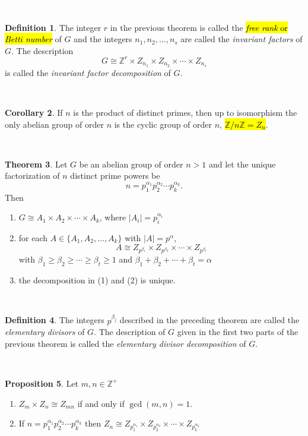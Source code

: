 \documentclass{article}
\theoremstyle{definition}
\newtheorem{thm}{Theorem}[section]
\newtheorem{prop}[thm]{Proposition}
\newtheorem{cor}[thm]{Corollary}
\newtheorem{defn}[thm]{Definition}
\newcommand{\nl}{\textcolor{white}{nothing}}
\newcommand{\Z}{\mathbb{Z}}
\newcommand{\al}{\alpha}
\newcommand{\be}{\beta}
\begin{document}
\nl

\begin{defn}
The integer $r$ in the previous theorem is called the \hl{\textit{free rank} or \textit{Betti number}} of $G$ and the integers $n_1, n_2,\ldots,n_s$ are called the \textit{invariant factors} of $G$. The description 
\[G\cong \Z^r\times Z_{n_1}\times Z_{n_2}\times\cdots\times Z_{n_s}\]
is called the \textit{invariant factor decomposition} of $G$.
\end{defn}

\nl

\begin{cor}
If $n$ is the product of distinct primes, then up to isomorphism the only abelian group of order $n$ is the cyclic group of order $n$, \hl{$\Z/n\Z = Z_n$}.
\end{cor}

\nl

\begin{thm}
Let $G$ be an abelian group of order $n > 1$ and let the unique factorization of $n$ distinct prime powers be
\[n = p_1^{\al_1}p_2^{\al_2}\cdots p_k^{\al_k}.\]
Then
\begin{enumerate}
\item $G\cong A_1\times A_2\times\cdots\times A_k$, where $|A_i| = p_i^{\al_i}$
\item for each $A\in \{A_1,A_2,\ldots,A_k\}$ with $|A| = p^\al$,
\[A\cong  Z_{p^{\be_1}}\times Z_{p^{\be_2}}\times\cdots\times Z_{p^{\be_t}}\]
with $\be_1\geq\be_2\geq\cdots\geq\be_t\geq 1$ and $\be_1+\be_2+\cdots+\be_t = \al$
\item the decomposition in (1) and (2) is unique.
\end{enumerate}
\end{thm}

\nl

\begin{defn}
The integers $p^{\be_j}$ described in the preceding theorem are called the \textit{elementary divisors} of $G$. The description of $G$ given in the first two parts of the previous theorem is called the \textit{elementary divisor decomposition} of $G$.
\end{defn}

\nl

\begin{prop}
Let $m,n\in \Z^+$
\begin{enumerate}
\item $Z_m\times Z_n\cong Z_{mn}$ if and only if $\gcd(m,n) = 1$.
\item If $n = p_1^{\al_1}p_2^{\al_2}\cdots p_k^{\al_k}$ then $Z_n \cong  Z_{p_1^{\al_1}}\times Z_{p_2^{\al_2}}\times\cdots\times Z_{p_k^{\al_k}}$
\end{enumerate}
\end{prop}
\end{document}
